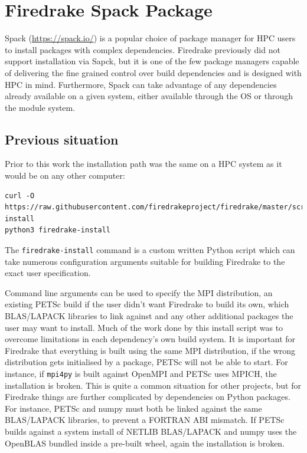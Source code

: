 \documentclass[a4paper,11pt]{article}
\begin{document}
\section{Firedrake Spack Package}
\label{sec:spack}
Spack (\url{https://spack.io/}) is a popular choice of package manager for HPC users to install packages with complex dependencies.
Firedrake previously did not support installation via Sapck, but it is one of the few package managers capable of delivering the fine grained control over build dependencies and is designed with HPC in mind.
Furthermore, Spack can take advantage of any dependencies already available on a given system, either available through the OS or through the module system.

\subsection{Previous situation}
\label{ssec:prev}
Prior to this work the installation path was the same on a HPC system as it would be on any other computer:
\begin{lstlisting}[caption={Firedrake install script install commands}]
curl -O https://raw.githubusercontent.com/firedrakeproject/firedrake/master/scripts/firedrake-install
python3 firedrake-install
\end{lstlisting}
The \verb`firedrake-install` command is a custom written Python script which can take numerous configuration arguments suitable for building Firedrake to the exact user specification.

Command line arguments can be used to specify the MPI distribution, an existing PETSc build if the user didn't want Firedrake to build its own, which BLAS/LAPACK libraries to link against and any other additional packages the user may want to install.
Much of the work done by this install script was to overcome limitations in each dependency's own build system.
It is important for Firedrake that everything is built using the same MPI distribution, if the wrong distribution gets initialised by a package, PETSc will not be able to start.
For instance, if \verb`mpi4py` is built against OpenMPI and PETSc uses MPICH, the installation is broken.
This is quite a common situation for other projects, but for Firedrake things are further complicated by dependencies on Python packages.
For instance, PETSc and numpy must both be linked against the same BLAS/LAPACK libraries, to prevent a FORTRAN ABI mismatch.
If PETSc builds against a system install of NETLIB BLAS/LAPACK and numpy uses the OpenBLAS bundled inside a pre-built wheel, again the installation is broken.
\end{document}
